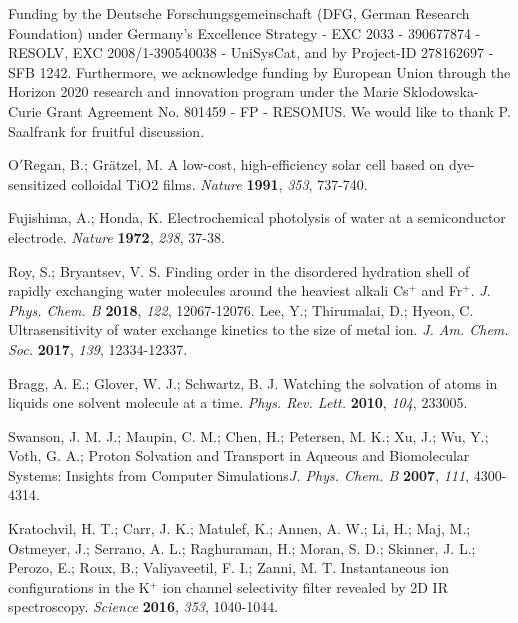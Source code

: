 \documentclass[aps,twocolumn,amssymb,amsfonts,amsmath,showpacs,final,a4paper,superscriptaddress]{revtex4-2}
\begin{document}
\begin{acknowledgments}
Funding by the Deutsche Forschungsgemeinschaft (DFG, German Research Foundation) under Germany's Excellence Strategy - EXC 2033 - 390677874 - RESOLV, EXC 2008/1-390540038 - UniSysCat, and by Project-ID 278162697 - SFB 1242. Furthermore, we acknowledge funding by European Union through the Horizon 2020 research and innovation program under the Marie Sklodowska-Curie Grant Agreement No. 801459 - FP - RESOMUS. We would like to thank P. Saalfrank for fruitful discussion.
\end{acknowledgments}



\begin{thebibliography}{99}
 O$'$Regan, B.; Gr\"{a}tzel, M. A low-cost, high-efficiency solar cell based on dye-sensitized colloidal TiO2 films. \textit{Nature} \textbf{1991}, \textit{353}, 737-740.

 Fujishima, A.; Honda, K. Electrochemical photolysis of water at a semiconductor electrode. \textit{Nature} \textbf{1972}, \textit{238}, 37-38.

 Roy, S.; Bryantsev, V. S. Finding order in the disordered hydration shell of rapidly exchanging water molecules around the heaviest alkali Cs$^+$ and Fr$^+$. \textit{J. Phys. Chem. B} \textbf{2018}, \textit{122}, 12067-12076.
 Lee, Y.; Thirumalai, D.; Hyeon, C. Ultrasensitivity of water exchange kinetics to the size of metal ion. \textit{J. Am. Chem. Soc.} \textbf{2017}, \textit{139}, 12334-12337.

 Bragg, A. E.; Glover, W. J.; Schwartz, B. J. Watching the solvation of atoms in liquids one solvent molecule at a time. \textit{Phys. Rev. Lett.} \textbf{2010}, \textit{104}, 233005.

 Swanson, J. M. J.; Maupin, C. M.; Chen, H.; Petersen, M. K.; Xu, J.; Wu, Y.;   Voth, G. A.; Proton Solvation and Transport in Aqueous and Biomolecular Systems: Insights from Computer Simulations\textit{J. Phys. Chem. B} \textbf{2007}, \textit{111}, 4300-4314.

 Kratochvil, H. T.; Carr, J. K.; Matulef, K.; Annen, A. W.; Li, H.; Maj, M.; Ostmeyer, J.; Serrano, A. L.; Raghuraman, H.; Moran, S. D.; Skinner, J. L.; Perozo, E.; Roux, B.; Valiyaveetil, F. I.; Zanni, M. T. Instantaneous ion configurations in the K$^+$ ion channel selectivity filter revealed by 2D IR spectroscopy. \textit{Science} \textbf{2016}, \textit{353}, 1040-1044.


\end{thebibliography}
\end{document}
